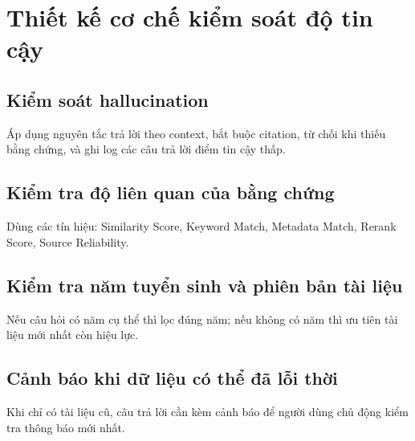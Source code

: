 ﻿\section{Thiết kế cơ chế kiểm soát độ tin cậy}

\subsection{Kiểm soát hallucination}

Áp dụng nguyên tắc trả lời theo context, bắt buộc citation, từ chối khi thiếu bằng chứng, và ghi log các câu trả lời điểm tin cậy thấp.

\subsection{Kiểm tra độ liên quan của bằng chứng}

Dùng các tín hiệu: Similarity Score, Keyword Match, Metadata Match, Rerank Score, Source Reliability.

\subsection{Kiểm tra năm tuyển sinh và phiên bản tài liệu}

Nếu câu hỏi có năm cụ thể thì lọc đúng năm; nếu không có năm thì ưu tiên tài liệu mới nhất còn hiệu lực.

\subsection{Cảnh báo khi dữ liệu có thể đã lỗi thời}

Khi chỉ có tài liệu cũ, câu trả lời cần kèm cảnh báo để người dùng chủ động kiểm tra thông báo mới nhất.

